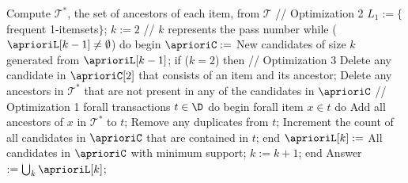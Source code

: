 Compute $\mathcal{T}^*$, the set of ancestors of each item, from $\mathcal{T}$ // Optimization 2
$L_1 := \{$frequent 1-itemsets$\}$;
$k:=2$ // $k$ represents the pass number
while ($\aprioriL[k-1] \neq \emptyset$) do begin
	$\aprioriC := $ New candidates of size $k$ generated from $\aprioriL[k-1]$;
	if ($k = 2$) then // Optimization 3
		Delete any candidate in $\aprioriC[2]$ that consists of an item and its ancestor;
	Delete any ancestors in $\mathcal{T}^*$ that are not present in any of the candidates
    in $\aprioriC$ // Optimization 1
	forall transactions $t\in \D$ do begin
    forall item $x \in t$ do
      Add all ancestors of $x$ in $\mathcal{T}^*$ to $t$;
    Remove any duplicates from $t$;
		Increment the count of all candidates in $\aprioriC$ that are contained in $t$;
	end
	$\aprioriL[k] := $ All candidates in $\aprioriC$ with minimum support;
	$k := k+1$;
end
Answer $:=\bigcup_k{\aprioriL[k]}$;
